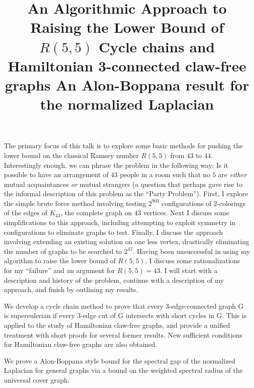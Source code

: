\documentclass{article}
\begin{document}
\title{  An Algorithmic Approach to Raising the Lower Bound of $R(5,5)$ }
\endtitle
The primary focus of this talk is to explore some basic methods
for pushing the lower bound on the classical Ramsey number $R(5,5)$ from
$43$ to $44$.  Interestingly enough, we can phrase the problem in the
following way: Is it possible to have an arrangement of $43$ people in a
room such that no $5$ are \textit{either} mutual acquaintances \textit{or}
mutual strangers (a question that perhaps gave rise to the informal
description of this problem as the ``Party Problem'').  First, I explore the
simple brute force method involving testing $2^{903}$ configurations of
$2$-colorings of the edges of $K_{43}$, the complete graph on $43$ vertices.
Next I discuss some simplifications to this approach, including attempting
to exploit symmetry in configurations to eliminate graphs to test.  Finally,
I discuss the approach involving extending an existing solution on one less
vertex, drastically eliminating the number of graphs to be searched to
$2^{42}$. Having been unsuccessful in using my algorithm to raise the lower
bound of $R(5,5)$, I discuss some rationalizations for my ``failure'' and an
argument for $R(5,5)=43$. I will start with a description and history of the
problem, continue with a description of my approach, and finish by outlining
my results. 



\vspace{.25in}

\title{ Cycle chains and Hamiltonian 3-connected claw-free graphs}
\endtitle
We develop a cycle chain method to prove that every
3-edge-connected graph G is supereulerian if every 3-edge cut of G
intersects with short cycles in G. This is applied to the study of
Hamiltonian claw-free graphs, and provide a unified treatment with short
proofs for several former results. New sufficient conditions for Hamiltonian
claw-free graphs are also obtained. 



\vspace{.25in}

\title{ An Alon-Boppana result for the normalized Laplacian}
\endtitle
We prove a Alon-Boppana style bound for the spectral gap of the normalized
Laplacian for general graphs via a bound on the weighted spectral radius of
the universal cover graph.
\end{document}
